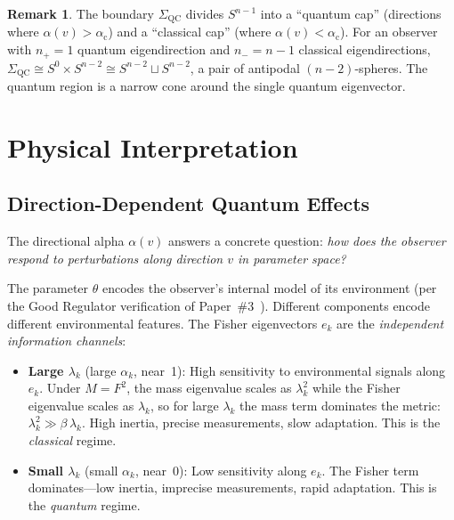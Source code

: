 \documentclass[11pt,a4paper]{article}
\theoremstyle{plain}
\theoremstyle{definition}
\newtheorem{remark}[theorem]{Remark}
\newcommand{\Sn}{S^{n-1}}
\newcommand{\SigmaQC}{\Sigma_{\mathrm{QC}}}
\newcommand{\alphac}{\alpha_{\mathrm{c}}}
\begin{document}
\begin{remark}
The boundary $\SigmaQC$ divides $\Sn$ into a ``quantum cap''
(directions where $\alpha(v) > \alphac$) and a ``classical cap''
(where $\alpha(v) < \alphac$).  For an observer with $n_+ = 1$
quantum eigendirection and $n_- = n-1$ classical eigendirections,
$\SigmaQC \cong S^0 \times S^{n-2} \cong S^{n-2} \sqcup S^{n-2}$,
a pair of antipodal $(n-2)$-spheres.  The quantum region is a
narrow cone around the single quantum eigenvector.
\end{remark}



\section{Physical Interpretation}
\label{sec:physical}

\subsection{Direction-Dependent Quantum Effects}

The directional alpha $\alpha(v)$ answers a concrete question:
\emph{how does the observer respond to perturbations along
direction $v$ in parameter space?}

The parameter $\theta$ encodes the observer's internal model of
its environment (per the Good Regulator verification of
Paper~\#3~\cite{companion_amari}).  Different components encode
different environmental features.  The Fisher eigenvectors $e_k$
are the \emph{independent information channels}:

\begin{itemize}[noitemsep]
\item \textbf{Large $\lambda_k$} (large $\alpha_k$, near~1):
  High sensitivity to environmental signals along $e_k$.
  Under $M = F^2$, the mass eigenvalue scales as $\lambda_k^2$
  while the Fisher eigenvalue scales as $\lambda_k$, so for
  large $\lambda_k$ the mass term dominates the metric:
  $\lambda_k^2 \gg \beta\,\lambda_k$.  High inertia, precise
  measurements, slow adaptation.  This is the \emph{classical}
  regime.

\item \textbf{Small $\lambda_k$} (small $\alpha_k$, near~0):
  Low sensitivity along $e_k$.  The Fisher term dominates---low
  inertia, imprecise measurements, rapid adaptation.  This is the
  \emph{quantum} regime.
\end{itemize}
\end{document}
